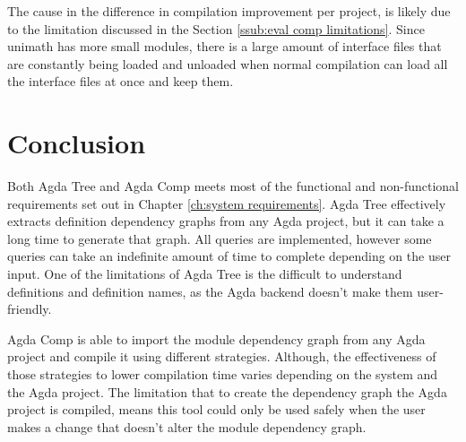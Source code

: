 The cause in the difference in compilation improvement per project, is likely
due to the limitation discussed in the Section \ref{ssub:eval comp
limitations}. Since unimath has more small modules, there is a large amount of
interface files that are constantly being loaded and unloaded when normal
compilation can load all the interface files at once and keep them. 

\section{Conclusion}

Both Agda Tree and Agda Comp meets most of the functional and non-functional
requirements set out in Chapter \ref{ch:system requirements}. Agda Tree
effectively extracts definition dependency graphs from any Agda project, but it
can take a long time to generate that graph. All queries are implemented,
however some queries can take an indefinite amount of time to complete
depending on the user input. One of the limitations of Agda Tree is the
difficult to understand definitions and definition names, as the Agda backend
doesn't make them user-friendly.

Agda Comp is able to import the module dependency graph from any Agda project
and compile it using different strategies. Although, the effectiveness of those
strategies to lower compilation time varies depending on the system and the
Agda project. The limitation that to create the dependency graph the Agda
project is compiled, means this tool could only be used safely when the user
makes a change that doesn't alter the module dependency graph.




